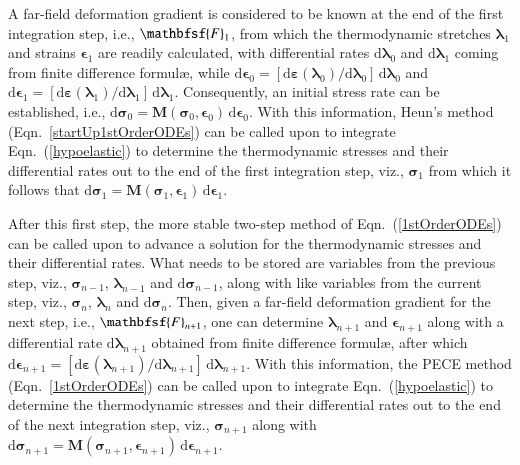 A far-field deformation gradient is considered to be known at the end of the first integration step, i.e., $\mathbfsf{F}_1$, from which the thermo\-dynamic stretches $\boldsymbol{\lambda}_1$ and strains $\boldsymbol{\epsilon}_1$ are readily calculated, with differential rates $\mathrm{d} \boldsymbol{\lambda}_0$ and $\mathrm{d} \boldsymbol{\lambda}_1$ coming from finite difference formul\ae, while $\mathrm{d} \boldsymbol{\epsilon}_0 = [ \mathrm{d} \boldsymbol{\varepsilon} ( \boldsymbol{\lambda}_0 ) / \mathrm{d} \boldsymbol{\lambda}_0 ] \, \mathrm{d} \boldsymbol{\lambda}_0$ and $\mathrm{d} \boldsymbol{\epsilon}_1 = [ \mathrm{d} \boldsymbol{\varepsilon} ( \boldsymbol{\lambda}_1 ) / \mathrm{d} \boldsymbol{\lambda}_1 ] \, \mathrm{d} \boldsymbol{\lambda}_1$.  Consequently, an initial stress rate can be established, i.e., $\mathrm{d} \boldsymbol{\sigma}_0 = \mathbf{M} ( \boldsymbol{\sigma}_0 , \boldsymbol{\epsilon}_0 ) \, \mathrm{d} \boldsymbol{\epsilon}_0$.  With this information, Heun's method (Eqn.~\ref{startUp1stOrderODEs}) can be called upon to integrate Eqn.~(\ref{hypoelastic}) to determine the thermo\-dynamic stresses and their differential rates out to the end of the first integration step, viz., $\boldsymbol{\sigma}_1$ from which it follows that $\mathrm{d} \boldsymbol{\sigma}_1 = \mathbf{M} ( \boldsymbol{\sigma}_1 , \boldsymbol{\epsilon}_1 ) \, \mathrm{d} \boldsymbol{\epsilon}_1$.    

After this first step, the more stable two-step method of Eqn.~(\ref{1stOrderODEs}) can be called upon to advance a solution for the thermo\-dynamic stresses and their differential rates.  What needs to be stored are variables from the previous step, viz., $\boldsymbol{\sigma}_{n-1}$, $\boldsymbol{\lambda}_{n-1}$ and $\mathrm{d} \boldsymbol{\sigma}_{n-1}$, along with like variables from the current step, viz.,  $\boldsymbol{\sigma}_n$, $\boldsymbol{\lambda}_n$ and $\mathrm{d} \boldsymbol{\sigma}_n$.  Then, given a far-field deformation gradient for the next step, i.e., $\mathbfsf{F}_{n+1}$, one can determine $\boldsymbol{\lambda}_{n+1}$ and $\boldsymbol{\epsilon}_{n+1}$ along with a differential rate $\mathrm{d} \boldsymbol{\lambda}_{n+1}$ obtained from finite difference formul\ae, after which $\mathrm{d} \boldsymbol{\epsilon}_{n+1} = [ \mathrm{d} \boldsymbol{\varepsilon} ( \boldsymbol{\lambda}_{n+1} ) / \mathrm{d} \boldsymbol{\lambda}_{n+1} ] \, \mathrm{d} \boldsymbol{\lambda}_{n+1}$.  With this information, the PECE method (Eqn.~\ref{1stOrderODEs}) can be called upon to integrate Eqn.~(\ref{hypoelastic}) to determine the thermo\-dynamic stresses and their differential rates out to the end of the next integration step, viz., $\boldsymbol{\sigma}_{n+1}$ along with $\mathrm{d} \boldsymbol{\sigma}_{n+1} = \mathbf{M} ( \boldsymbol{\sigma}_{n+1} , \boldsymbol{\epsilon}_{n+1} ) \, \mathrm{d} \boldsymbol{\epsilon}_{n+1}$.

